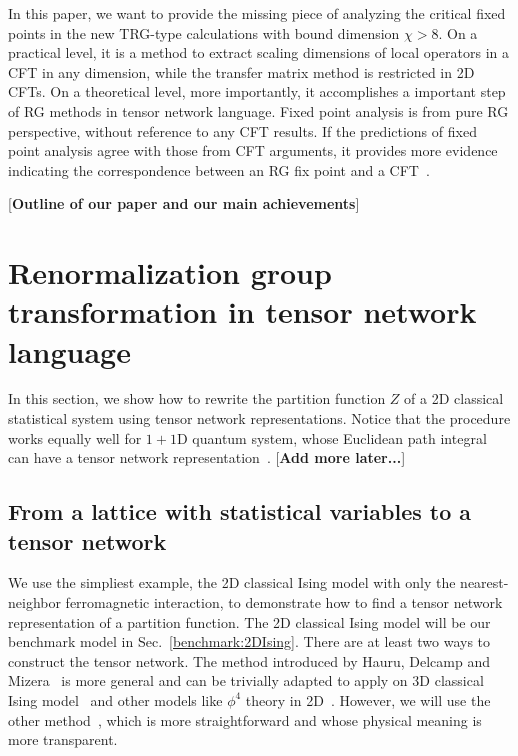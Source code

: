 \documentclass[aps,prb,reprint,superscriptaddress]{revtex4-2}
\begin{document}
In this paper, we want to provide the missing piece of analyzing the
critical fixed points in the new TRG-type calculations with bound
dimension $\chi > 8$. On a practical level, it is a method to extract
scaling dimensions of local operators in a CFT in any dimension, while
the transfer matrix method is restricted in 2D CFTs. On a theoretical
level, more importantly, it accomplishes a important step of RG methods
in tensor network language.  Fixed point analysis is from pure RG
perspective, without reference to any CFT results. If the predictions of
fixed point analysis agree with those from CFT arguments, it provides
more evidence indicating the correspondence between an RG fix point and
a CFT~\cite{poland2019}.
%

[\textbf{Outline of our paper and our main achievements}]


\section{Renormalization group transformation in tensor network
language\label{introTRG}}
In this section, we show how to rewrite the partition function $Z$ of
a 2D classical statistical system using tensor network representations.
Notice that the procedure works equally well for $1 + 1$D quantum
system, whose Euclidean path integral can have a tensor network
representation~\cite{GuWen2009}. [\textbf{Add more later...}]
%
\subsection{From a lattice with statistical variables to a tensor
network\label{spin2tensor}}
We use the simpliest example, the 2D classical Ising model with only the
nearest-neighbor ferromagnetic interaction, to demonstrate how to find a
tensor network representation of a partition function. The 2D classical
Ising model will be our benchmark model in Sec.~\ref{benchmark:2DIsing}.
There are at least two ways to construct the tensor network. The method
introduced by Hauru, Delcamp and Mizera~\cite{gilts} is more general and
can be trivially adapted to apply on 3D classical Ising
model~\cite{hotrg} and other models like $\phi^4$ theory in
2D~\cite{Delcamp2020}. However, we will use the other method~\cite{trg,
tnr}, which is more straightforward and whose physical meaning is more
transparent.
%
\end{document}

